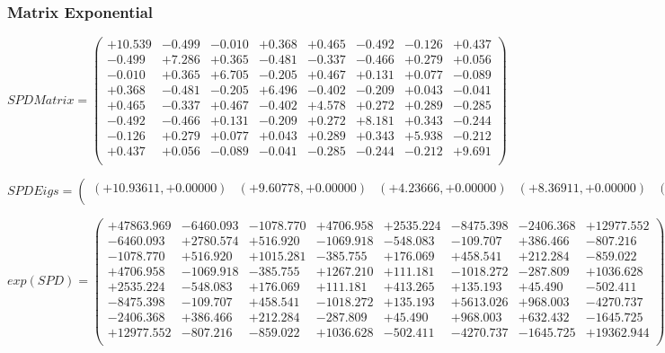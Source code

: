 \documentclass[9pt]{article}
\theoremstyle{plain}
\theoremstyle{definition}
\theoremstyle{remark}
\numberwithin{equation}{section}
\begin{document}
\subsubsection{Matrix Exponential }
$SPD Matrix = \left(
\begin{array}{
cccccccc}
+10.539 & -0.499 & -0.010 & +0.368 & +0.465 & -0.492 & -0.126 & +0.437 \\
-0.499 & +7.286 & +0.365 & -0.481 & -0.337 & -0.466 & +0.279 & +0.056 \\
-0.010 & +0.365 & +6.705 & -0.205 & +0.467 & +0.131 & +0.077 & -0.089 \\
+0.368 & -0.481 & -0.205 & +6.496 & -0.402 & -0.209 & +0.043 & -0.041 \\
+0.465 & -0.337 & +0.467 & -0.402 & +4.578 & +0.272 & +0.289 & -0.285 \\
-0.492 & -0.466 & +0.131 & -0.209 & +0.272 & +8.181 & +0.343 & -0.244 \\
-0.126 & +0.279 & +0.077 & +0.043 & +0.289 & +0.343 & +5.938 & -0.212 \\
+0.437 & +0.056 & -0.089 & -0.041 & -0.285 & -0.244 & -0.212 & +9.691 \\
\end{array}
\right)$ \newline 

$SPD Eigs = \left(
\begin{array}{
cccccccc}
(+10.93611,+0.00000) & (+9.60778,+0.00000) & (+4.23666,+0.00000) & (+8.36911,+0.00000) & (+7.56229,+0.00000) & (+5.82791,+0.00000) & (+6.54198,+0.00000) & (+6.33139,+0.00000) \\
\end{array}
\right)$ \newline 

$exp(SPD) = \left(
\begin{array}{
cccccccc}
+47863.969 & -6460.093 & -1078.770 & +4706.958 & +2535.224 & -8475.398 & -2406.368 & +12977.552 \\
-6460.093 & +2780.574 & +516.920 & -1069.918 & -548.083 & -109.707 & +386.466 & -807.216 \\
-1078.770 & +516.920 & +1015.281 & -385.755 & +176.069 & +458.541 & +212.284 & -859.022 \\
+4706.958 & -1069.918 & -385.755 & +1267.210 & +111.181 & -1018.272 & -287.809 & +1036.628 \\
+2535.224 & -548.083 & +176.069 & +111.181 & +413.265 & +135.193 & +45.490 & -502.411 \\
-8475.398 & -109.707 & +458.541 & -1018.272 & +135.193 & +5613.026 & +968.003 & -4270.737 \\
-2406.368 & +386.466 & +212.284 & -287.809 & +45.490 & +968.003 & +632.432 & -1645.725 \\
+12977.552 & -807.216 & -859.022 & +1036.628 & -502.411 & -4270.737 & -1645.725 & +19362.944 \\
\end{array}
\right)$ \newline 
\end{document}

